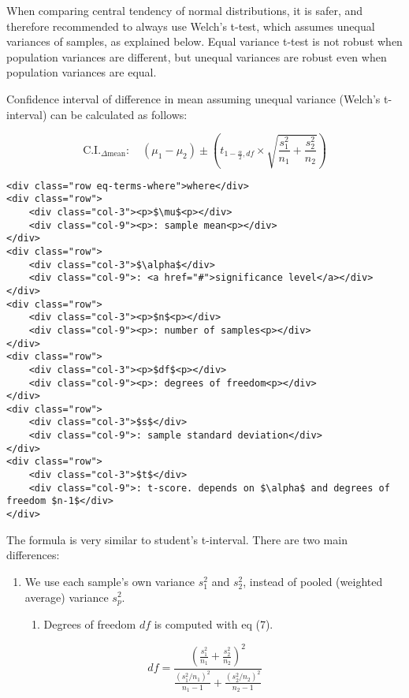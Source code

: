 \documentclass[11pt]{article}
\providecommand{\tightlist}{%
      \setlength{\itemsep}{0pt}\setlength{\parskip}{0pt}}
\begin{document}
When comparing central tendency of normal distributions, it is safer,
and therefore recommended to always use Welch's t-test, which assumes
unequal variances of samples, as explained below. Equal variance t-test
is not robust when population variances are different, but unequal
variances are robust even when population variances are equal.

Confidence interval of difference in mean assuming unequal variance
(Welch's t-interval) can be calculated as follows:

\hypertarget{eq-6}{}
\[ \text{C.I.}_{\Delta \text{mean}}: \quad (\mu_{1}- \mu_{2}) \pm (t_{1-\frac{\alpha}{2},df} \times \sqrt{\frac{s_1^2}{n_1}+\frac{s_2^2}{n_2}}) \tag{6}\]

\begin{verbatim}
<div class="row eq-terms-where">where</div>
<div class="row">
    <div class="col-3"><p>$\mu$<p></div>
    <div class="col-9"><p>: sample mean<p></div>
</div>
<div class="row">
    <div class="col-3">$\alpha$</div>
    <div class="col-9">: <a href="#">significance level</a></div>
</div>    
<div class="row">
    <div class="col-3"><p>$n$<p></div>
    <div class="col-9"><p>: number of samples<p></div>
</div>
<div class="row">
    <div class="col-3"><p>$df$<p></div>
    <div class="col-9"><p>: degrees of freedom<p></div>
</div>    
<div class="row">
    <div class="col-3">$s$</div>
    <div class="col-9">: sample standard deviation</div>
</div>   
<div class="row">
    <div class="col-3">$t$</div>
    <div class="col-9">: t-score. depends on $\alpha$ and degrees of freedom $n-1$</div>
</div>   
\end{verbatim}

The formula is very similar to student's t-interval. There are two main
differences:

\begin{enumerate}
\def\labelenumi{\arabic{enumi}.}
\tightlist
\item
  We use each sample's own variance \(s_1^2\) and \(s_2^2\), instead of
  pooled (weighted average) variance \(s_p^2\).

  \begin{enumerate}
  \def\labelenumii{\arabic{enumii}.}
  \setcounter{enumii}{1}
  \tightlist
  \item
    Degrees of freedom {\(df\)} is computed with eq (7).
  \end{enumerate}
\end{enumerate}

\hypertarget{eq-7}{}
\[ df = \frac{(\frac{s^2_1}{n_1} + \frac{s^2_2}{n_2})^2}{\frac{(s^2_1/n_1)^2}{n_1-1} + \frac{(s^2_2/n_2)^2}{n_2-1}} \tag{7}\]
\end{document}
